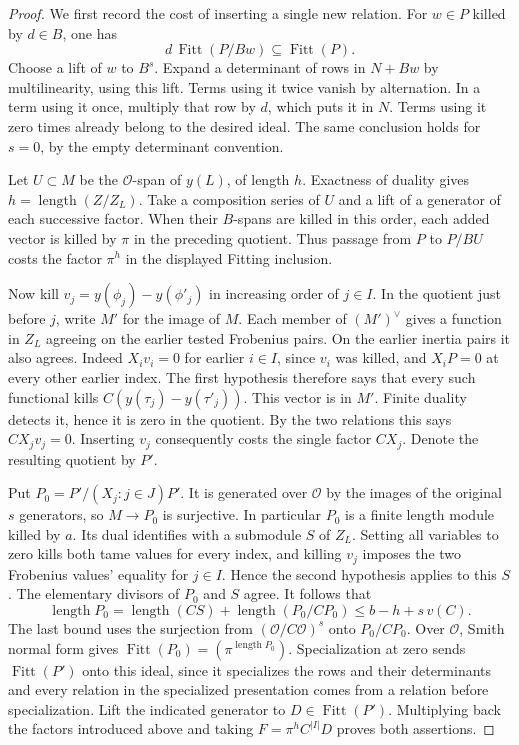 \documentclass[a4paper,11pt]{article}
\theoremstyle{definition}
\theoremstyle{remark}
\newcommand{\len}{\operatorname{length}}\newcommand{\Res}{\operatorname*{Res}}
\numberwithin{equation}{section}
\begin{document}
\begin{proof}
We first record the cost of inserting a single new relation.
For \(w\in P\) killed by \(d\in B\), one has
\[
        d\,\operatorname{Fitt}(P/Bw)\subseteq\operatorname{Fitt}(P).
\]
Choose a lift of \(w\) to \(B^s\). Expand a determinant of rows
in \(N+B w\) by multilinearity, using this lift. Terms using it
twice vanish by alternation. In a term using it once, multiply
that row by \(d\), which puts it in \(N\). Terms using it zero
times already belong to the desired ideal. The same conclusion
holds for \(s=0\), by the empty determinant convention.

Let \(U\subset M\) be the \(\mathcal O\)-span of \(y(L)\), of length
\(h\). Exactness of duality gives \(h=\len(Z/Z_L)\). Take a
composition series of \(U\) and a lift of a generator of each
successive factor. When their \(B\)-spans are killed in this
order, each added vector is killed by \(\pi\) in the preceding
quotient. Thus passage from \(P\) to \(P/BU\) costs the factor
\(\pi^h\) in the displayed Fitting inclusion.

Now kill \(v_j=y(\phi_j)-y(\phi'_j)\) in increasing order of
\(j\in I\). In the quotient just before \(j\), write \(M'\) for
the image of \(M\). Each member of \((M')^\vee\) gives a
function in \(Z_L\) agreeing on the earlier tested Frobenius
pairs. On the earlier inertia pairs it also agrees. Indeed
\(X_i v_i=0\) for earlier \(i\in I\), since \(v_i\) was killed,
and \(X_iP=0\) at every other earlier index. The first hypothesis
therefore says that every such functional kills
\(C(y(\tau_j)-y(\tau'_j))\). This vector is in \(M'\).
Finite duality detects it, hence it is zero in the quotient.
By the two relations this says \(CX_jv_j=0\).
Inserting \(v_j\) consequently costs the single factor \(CX_j\).
Denote the resulting quotient by \(P'\).

Put \(P_0=P'/(X_j:j\in J)P'\). It is generated over
\(\mathcal O\) by the images of the original \(s\) generators,
so \(M\to P_0\) is surjective. In particular \(P_0\) is a
finite length module killed by \(a\). Its dual identifies with
a submodule \(S\) of \(Z_L\). Setting all variables to zero
kills both tame values for every index, and killing \(v_j\)
imposes the two Frobenius values' equality for \(j\in I\).
Hence the second hypothesis applies to this \(S\). The
elementary divisors of \(P_0\) and \(S\) agree. It follows that
\[
            \len P_0=\len(CS)+\len(P_0/CP_0)
                      \le b-h+s\,v(C).
\]
The last bound uses the surjection from
\((\mathcal O/C\mathcal O)^s\) onto \(P_0/CP_0\).
Over \(\mathcal O\), Smith normal form gives
\(\operatorname{Fitt}(P_0)=(\pi^{\len P_0})\).
Specialization at zero sends \(\operatorname{Fitt}(P')\)
onto this ideal, since it specializes the rows and their
determinants and every relation in the specialized presentation
comes from a relation before specialization. Lift the indicated
generator to \(D\in\operatorname{Fitt}(P')\).
Multiplying back the factors introduced above and taking
\(F=\pi^h C^{|I|}D\) proves both assertions.
\end{proof}
\end{document}
